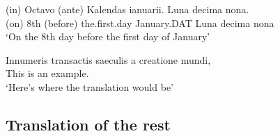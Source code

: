 \documentclass[a4paper]{article}
\begin{document}
\begin{exe}
    \sn
    \gll (in) Octavo (ante) Kalendas ianuarii. Luna decima nona.  \\
    (on) 8th (before) the.first.day January.DAT Luna decima nona\\
    \glt  `On the 8th day before the first day of January' 

    \sn
    \gll Innumeris transactis saeculis a creatione mundi,  \\
     This is an example.\\
    \trans `Here's where the translation would be'
\end{exe}


\subsection{Translation of the rest}




 
\end{document}
